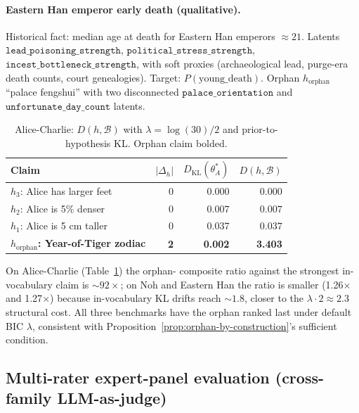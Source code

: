 \documentclass{article}
\begin{document}
\paragraph{Eastern Han emperor early death (qualitative).}
Historical fact: median age at death for Eastern Han emperors
$\approx 21$. Latents
$\mathtt{lead\_poisoning\_strength}$, $\mathtt{political\_stress\_strength}$,
$\mathtt{incest\_bottleneck\_strength}$, with soft proxies
(archaeological lead, purge-era death counts, court genealogies).
Target: $P(\text{young\_death})$. Orphan
$h_{\mathrm{orphan}}$ ``palace fengshui'' with two disconnected
$\mathtt{palace\_orientation}$ and $\mathtt{unfortunate\_day\_count}$
latents.

\begin{table}[h]
\centering
\caption{Alice-Charlie: $D(h, \mathcal{B})$ with $\lambda = \log(30)/2$
and prior-to-hypothesis KL. Orphan claim bolded.}
\label{tab:alice-charlie}
\begin{tabular}{lrrr}
\toprule
Claim & $|\Delta_{h}|$ & $D_{\mathrm{KL}}(\theta^{*}_{A})$ & $D(h, \mathcal{B})$ \\
\midrule
$h_{3}$: Alice has larger feet & 0 & $0.000$ & $0.000$ \\
$h_{2}$: Alice is 5\% denser   & 0 & $0.007$ & $0.007$ \\
$h_{1}$: Alice is 5 cm taller  & 0 & $0.037$ & $0.037$ \\
\midrule
\textbf{$h_{\mathrm{orphan}}$: Year-of-Tiger zodiac} & \textbf{2} & \textbf{0.002} & \textbf{3.403} \\
\bottomrule
\end{tabular}
\end{table}

On Alice-Charlie (Table~\ref{tab:alice-charlie}) the orphan-
composite ratio against the strongest in-vocabulary claim is
$\sim 92 \times$; on Noh and Eastern Han the ratio is smaller
(1.26$\times$ and 1.27$\times$) because in-vocabulary KL drifts
reach $\sim 1.8$, closer to the $\lambda \cdot 2 \approx 2.3$
structural cost. All three benchmarks have the orphan ranked last
under default BIC $\lambda$, consistent with
Proposition~\ref{prop:orphan-by-construction}'s sufficient
condition.

\subsection{Multi-rater expert-panel evaluation (cross-family LLM-as-judge)}
\label{sec:expert-panel}
\end{document}
